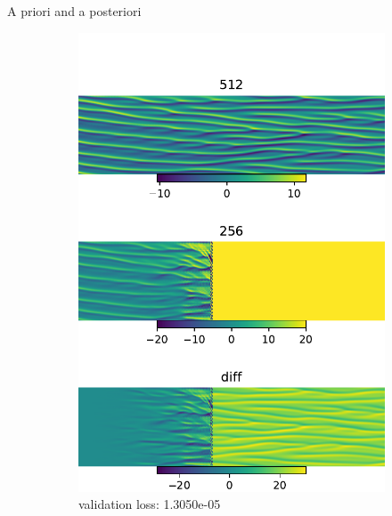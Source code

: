 \documentclass[paper slide]{beamer}
\begin{document}
\begin{frame}{A priori and a posteriori}
\begin{figure}[ht]
\begin{subfigure}[b]{0.33\textwidth}
			\includegraphics[width=\textwidth]{fig/ks_nu0.1_N1512N2256_correct_cmp_lr2e-4.pdf} 
			\caption{validation loss: 1.3050e-05} 
		\end{subfigure}
		\begin{subfigure}[b]{0.33\textwidth}
			\centering 

\end{subfigure}
\end{figure}
\end{frame}
\end{document}
